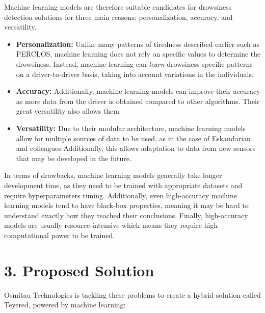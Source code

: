 \documentclass[12pt]{extarticle}
\begin{document}
Machine learning models are therefore suitable candidates for drowsiness
detection solutions for three main reasons: personalization, accuracy,
and versatility.

\begin{itemize}
\item
  \textbf{Personalization:} Unlike many patterns of tiredness described
  earlier such as PERCLOS, machine learning does not rely on specific
  values to determine the drowsiness. Instead, machine learning can
  \emph{learn} drowsiness-specific patterns on a driver-to-driver basis,
  taking into account variations in the individuals.
\item
  \textbf{Accuracy:} Additionally, machine learning models can improve
  their accuracy as more data from the driver is obtained compared to
  other algorithms. Their great versatility also allows them
\item
  \textbf{Versatility:} Due to their modular architecture, machine
  learning models allow for multiple sources of data to be used, as in
  the case of Eskandarian and colleagues Additionally, this allows
  adaptation to data from new sensors that may be developed in the
  future.
\end{itemize}

In terms of drawbacks, machine learning models generally take longer
development time, as they need to be trained with appropriate datasets
and require hyperparameters tuning. Additionally, even high-accuracy
machine learning models tend to have black-box properties, meaning it
may be hard to understand exactly how they reached their conclusions.
Finally, high-accuracy models are usually resource-intensive which means
they require high computational power to be trained.

\hypertarget{proposed-solution}{%
\section{3. Proposed Solution}\label{proposed-solution}}

Osmitau Technologies is tackling these problems to create a hybrid
solution called Teyered, powered by machine learning:
\end{document}
